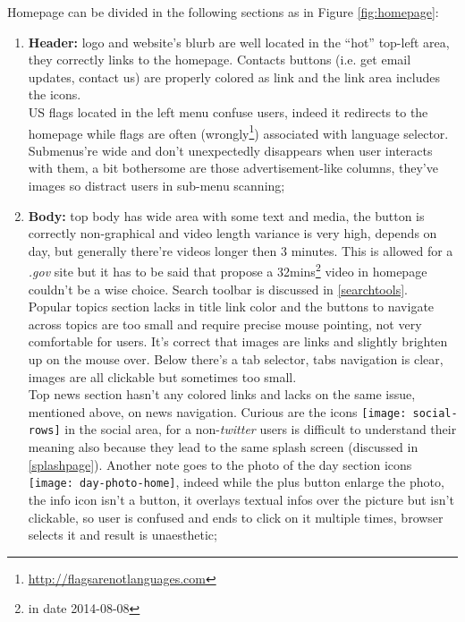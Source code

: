 \documentclass[
10pt, %
a4paper, %
oneside, %
headinclude,footinclude, %
BCOR5mm, %
]{scrartcl}
\begin{document}
Homepage can be divided in the following sections as in Figure \ref{fig:homepage}:
	
	\begin{enumerate}
		
		\item \textbf{Header:} logo and website's blurb are well located in the ``hot'' top-left area, they correctly links to the homepage. Contacts buttons (i.e. get email updates, contact us) are properly colored as link and the link area includes the icons. \\
		US flags located in the left menu confuse users, indeed it redirects to the homepage while flags are often (wrongly\footnote{\href{http://flagsarenotlanguages.com}{http://flagsarenotlanguages.com}}) associated with language selector. \\
		Submenus're wide and don't unexpectedly disappears when user interacts with them, a bit bothersome are those advertisement-like columns, they've images so distract users in sub-menu scanning;
		
		\item \textbf{Body:} top body has wide area with some text and media, the button is correctly non-graphical and video length variance is very high, depends on day, but generally there're videos longer then 3 minutes. This is allowed for a \emph{.gov} site but it has to be said that propose a 32mins\footnote{in date 2014-08-08} video in homepage couldn't be a wise choice. Search toolbar is discussed in \ref{searchtools}. \\
		Popular topics section lacks in title link color and the buttons to navigate across topics are too small and require precise mouse pointing, not very comfortable for users. It's correct that images are links and slightly brighten up on the mouse over. Below there's a tab selector, tabs navigation is clear, images are all clickable but sometimes too small. \\
		Top news section hasn't any colored links and lacks on the same issue, mentioned above, on news navigation. Curious are the icons \texttt{[image: social-rows]} in the social area, for a non-\emph{twitter} users is difficult to understand their meaning also because they lead to the same splash screen (discussed in \ref{splashpage}). Another note goes to the photo of the day section icons \texttt{[image: day-photo-home]}, indeed while the plus button enlarge the photo, the info icon isn't a button, it overlays textual infos over the picture but isn't clickable, so user is confused and ends to click on it multiple times, browser selects it and result is unaesthetic;
		

\end{enumerate}
\end{document}
